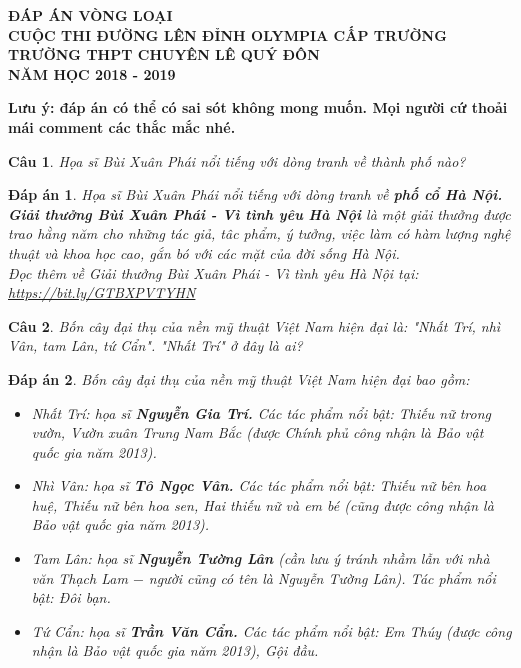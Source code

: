 \documentclass[12pt,a4paper]{article}
\author{Nguyễn Văn Lộc - 20120131}
\newtheorem{ques}{Câu}
\theoremstyle{nonumberplain}
\newtheorem{ans}{Đáp án}
\begin{document}
\begin{center}
\textbf{ĐÁP ÁN VÒNG LOẠI\\}
\textbf{CUỘC THI ĐƯỜNG LÊN ĐỈNH OLYMPIA CẤP TRƯỜNG\\}
\textbf{TRƯỜNG THPT CHUYÊN LÊ QUÝ ĐÔN\\}
\textbf{NĂM HỌC 2018 - 2019}
\end{center}
\textbf{Lưu ý: đáp án có thể có sai sót không mong muốn. Mọi người cứ thoải mái comment các thắc mắc nhé.}
\begin{ques}
Họa sĩ Bùi Xuân Phái nổi tiếng với dòng tranh về thành phố nào?
\end{ques}
\begin{mybox}
\begin{ans}
Họa sĩ Bùi Xuân Phái nổi tiếng với dòng tranh về \textbf{phố cổ Hà Nội.}\\
\textbf{Giải thưởng Bùi Xuân Phái - Vì tình yêu Hà Nội} là một giải thưởng được trao hằng năm cho những tác giả, tâc phẩm, ý tưởng, việc làm có hàm lượng nghệ thuật và khoa học cao, gắn bó với các mặt của đời sống Hà Nội.\\
Đọc thêm về Giải thưởng Bùi Xuân Phái - Vì tình yêu Hà Nội tại: \url{https://bit.ly/GTBXPVTYHN}
\end{ans} \end{mybox}
\begin{ques}
Bốn cây đại thụ của nền mỹ thuật Việt Nam hiện đại là: \textit{"Nhất Trí, nhì Vân, tam Lân, tứ Cẩn"}. "Nhất Trí" ở đây là ai?
\end{ques}
\begin{mybox}
\begin{ans}
Bốn cây đại thụ của nền mỹ thuật Việt Nam hiện đại bao gồm:
\begin{itemize}
\item Nhất Trí: họa sĩ \textbf{Nguyễn Gia Trí.} Các tác phẩm nổi bật: \textit{Thiếu nữ trong vườn,} \textit{Vườn xuân Trung Nam Bắc} (được Chính phủ công nhận là Bảo vật quốc gia năm 2013).
\item Nhì Vân: họa sĩ \textbf{Tô Ngọc Vân.} Các tác phẩm nổi bật: \textit{Thiếu nữ bên hoa huệ,} \textit{Thiếu nữ bên hoa sen,} \textit{Hai thiếu nữ và em bé} (cũng được công nhận là Bảo vật quốc gia năm 2013).
\item Tam Lân: họa sĩ \textbf{Nguyễn Tường Lân} (cần lưu ý tránh nhầm lẫn với nhà văn Thạch Lam \(-\) người cũng có tên là Nguyễn Tường Lân). Tác phẩm nổi bật: \textit{Đôi bạn.}  
\item Tứ Cẩn: họa sĩ \textbf{Trần Văn Cẩn.} Các tác phẩm nổi bật: \textit{Em Thúy} (được công nhận là Bảo vật quốc gia năm 2013), \textit{Gội đầu.}
\end{itemize}
\end{ans} \end{mybox}
\end{document}

